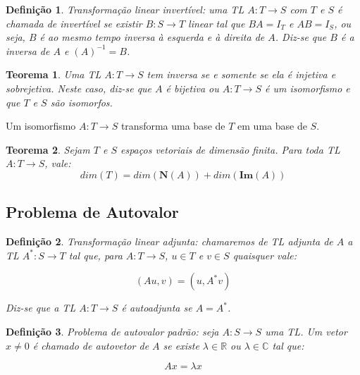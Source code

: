 \documentclass[a4paper,portuguese,9pt]{extarticle}
\newtheorem{theorem}{Teorema}[section]
\newtheorem*{definition}{Definição}
\begin{document}
\begin{multicols*}{2}
\begin{definition}
Transformação linear invertível: uma TL $A:T \rightarrow S$ com $T$ e $S$ é chamada de invertível se existir $B:S \rightarrow T$ linear tal que $BA=I_T$ e $AB=I_S$, ou seja, $B$ é ao mesmo tempo inversa à esquerda e à direita de $A$. Diz-se que $B$ é a inversa de $A$ e $(A)^{-1} = B$.
\end{definition}

\begin{theorem}
Uma TL $A:T \rightarrow S$ tem inversa se e somente se ela é injetiva e sobrejetiva. Neste caso, diz-se que $A$ é bijetiva ou $A:T \rightarrow S$ é um isomorfismo e que $T$ e $S$ são isomorfos.
\end{theorem}

Um isomorfismo $A:T \rightarrow S$ transforma uma base de $T$ em uma base de $S$.

\begin{theorem}
Sejam $T$ e $S$ espaços vetoriais de dimensão  finita. Para toda TL $A:T \rightarrow S$, vale:
  \begin{equation*}
      dim(T)=dim(\mathbf{N}(A)) + dim(\mathbf{Im}(A)) 
  \end{equation*}
\end{theorem}

\subsection{Problema de Autovalor}

\begin{definition}
Transformação linear adjunta: chamaremos de TL adjunta de $A$ a TL $A^{*}:S \rightarrow T$ tal que, para $A:T \rightarrow S$, $u \in T$ e $v \in S$ quaisquer vale:

    \begin{equation*}
        (Au,v) = (u, A^{*}v)
    \end{equation*}
    
Diz-se que a TL $A:T \rightarrow S$ é autoadjunta se $A=A^{*}$.

\end{definition}

\begin{definition}
Problema de autovalor padrão: seja $A:S \rightarrow S$ uma TL. Um vetor $x \ne
    0$ é chamado de autovetor de $A$ se existe $\lambda \in \mathbb{R}$ ou
    $\lambda \in \mathbb{C}$ tal que:

    \begin{equation*}
        Ax=\lambda x
    \end{equation*}


\end{definition}
\end{multicols*}
\end{document}
